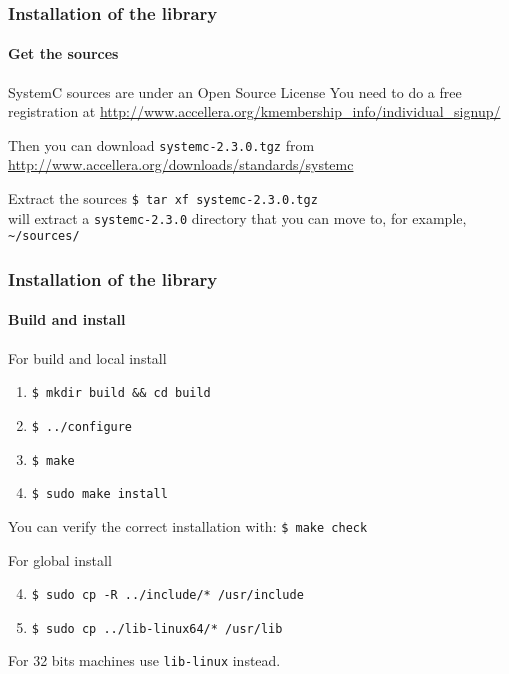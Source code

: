 \begin{frame}
\frametitle{Installation of the library}
\framesubtitle{Get the sources}

\begin{block}{SystemC sources are under an Open Source License}
You need to do a free registration at 
{ \scriptsize
\url{http://www.accellera.org/kmembership_info/individual_signup/}
}

\medskip 
Then you can download \texttt{systemc-2.3.0.tgz} from 
{ \scriptsize
\url{http://www.accellera.org/downloads/standards/systemc}
}
\end{block}
\begin{block}{Extract the sources}
\texttt{\$ tar xf systemc-2.3.0.tgz} \\
will extract a \texttt{systemc-2.3.0} directory that you can move to, for example,
\texttt{\textasciitilde{}/sources/}
\end{block}

\end{frame}

\begin{frame}
\frametitle{Installation of the library}
\framesubtitle{Build and install}

\begin{block}{For build and local install}
\begin{enumerate}
\item \texttt{\$ mkdir build \&\& cd build}
\item \texttt{\$ ../configure}
\item \texttt{\$ make}
\item \texttt{\$ sudo make install}
\end{enumerate}
You can verify the correct installation with: \texttt{\$ make check}
\end{block}
\pause
\begin{block}{For global install}
\begin{enumerate}
\setcounter{enumi}{3}
\item \texttt{\$ sudo cp -R ../include/* /usr/include}
\item \texttt{\$ sudo cp ../lib-linux64/* /usr/lib}
\end{enumerate}
For 32 bits machines use \texttt{lib-linux} instead.
\end{block}

\end{frame}


